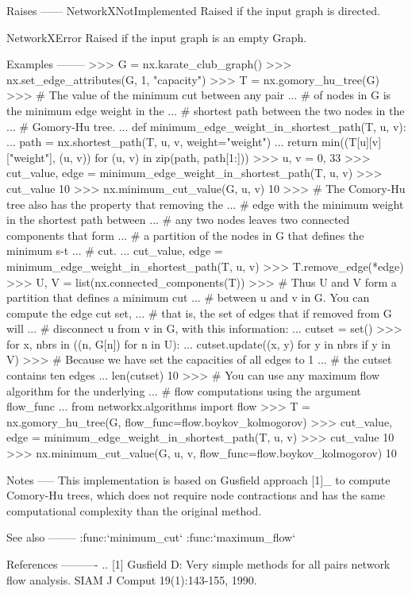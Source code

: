 \begin{DoxyVerb}
Raises
------
NetworkXNotImplemented
    Raised if the input graph is directed.

NetworkXError
    Raised if the input graph is an empty Graph.

Examples
--------
>>> G = nx.karate_club_graph()
>>> nx.set_edge_attributes(G, 1, "capacity")
>>> T = nx.gomory_hu_tree(G)
>>> # The value of the minimum cut between any pair
... # of nodes in G is the minimum edge weight in the
... # shortest path between the two nodes in the
... # Gomory-Hu tree.
... def minimum_edge_weight_in_shortest_path(T, u, v):
...     path = nx.shortest_path(T, u, v, weight="weight")
...     return min((T[u][v]["weight"], (u, v)) for (u, v) in zip(path, path[1:]))
>>> u, v = 0, 33
>>> cut_value, edge = minimum_edge_weight_in_shortest_path(T, u, v)
>>> cut_value
10
>>> nx.minimum_cut_value(G, u, v)
10
>>> # The Comory-Hu tree also has the property that removing the
... # edge with the minimum weight in the shortest path between
... # any two nodes leaves two connected components that form
... # a partition of the nodes in G that defines the minimum s-t
... # cut.
... cut_value, edge = minimum_edge_weight_in_shortest_path(T, u, v)
>>> T.remove_edge(*edge)
>>> U, V = list(nx.connected_components(T))
>>> # Thus U and V form a partition that defines a minimum cut
... # between u and v in G. You can compute the edge cut set,
... # that is, the set of edges that if removed from G will
... # disconnect u from v in G, with this information:
... cutset = set()
>>> for x, nbrs in ((n, G[n]) for n in U):
...     cutset.update((x, y) for y in nbrs if y in V)
>>> # Because we have set the capacities of all edges to 1
... # the cutset contains ten edges
... len(cutset)
10
>>> # You can use any maximum flow algorithm for the underlying
... # flow computations using the argument flow_func
... from networkx.algorithms import flow
>>> T = nx.gomory_hu_tree(G, flow_func=flow.boykov_kolmogorov)
>>> cut_value, edge = minimum_edge_weight_in_shortest_path(T, u, v)
>>> cut_value
10
>>> nx.minimum_cut_value(G, u, v, flow_func=flow.boykov_kolmogorov)
10

Notes
-----
This implementation is based on Gusfield approach [1]_ to compute
Comory-Hu trees, which does not require node contractions and has
the same computational complexity than the original method.

See also
--------
:func:`minimum_cut`
:func:`maximum_flow`

References
----------
.. [1] Gusfield D: Very simple methods for all pairs network flow analysis.
       SIAM J Comput 19(1):143-155, 1990.\end{DoxyVerb}
 

